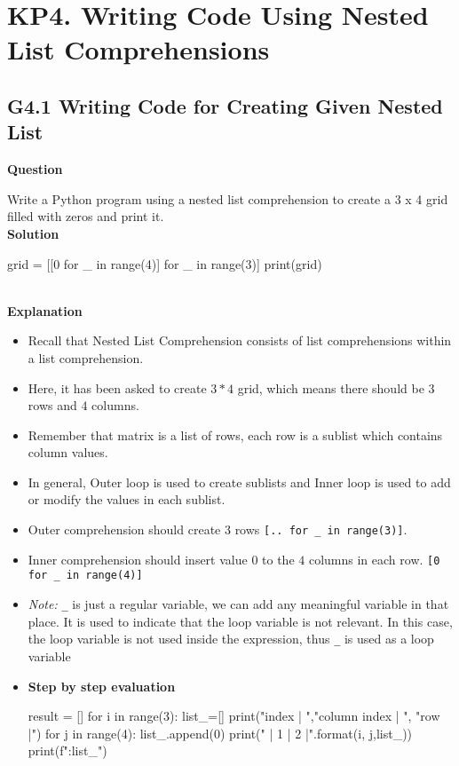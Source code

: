 \documentclass[10pt]{extarticle}
\begin{document}
\section*{KP4. Writing Code Using Nested List Comprehensions}
\subsection*{G4.1 Writing Code for Creating Given Nested List}

\textbf{Question}

Write a Python program using a nested list comprehension to create a 3 x 4 grid filled with zeros and print it. \\

\noindent\textbf{Solution}

\begin{python}
grid = [[0 for _ in range(4)] for _ in range(3)]
print(grid)
\end{python}  \\

\noindent\textbf{Explanation}

\begin{itemize}
    \item Recall that Nested List Comprehension consists of list comprehensions within a list comprehension.
    \item Here, it has been asked to create $ 3*4$ grid, which means there should be $3$ rows and $4$ columns. 
    \item Remember that matrix is a list of rows, each row is a sublist which contains column values.
    \item In general, Outer loop is used to create sublists and Inner loop is used to add or modify the values in each sublist. 
    \item Outer comprehension should create $3$ rows  \colorbox{gray!20}{\texttt{[.. for \_ in range(3)]}}.
    \item Inner comprehension should insert value $0$ to the $4$ columns in each row.  \colorbox{gray!20}{\texttt{[0 for \_ in range(4)]}} 
    \item \textit{Note:} \texttt{\_} is just a regular variable, we can add any meaningful variable in that place. It is used to indicate that the loop variable is not relevant. In this case, the loop variable is not used inside the expression, thus \texttt{\_} is used as a loop variable
    \item \textbf{Step by step evaluation}
    \begin{tcolorbox}[colback=gray!20, colframe=gray!50, sharp corners=southwest]
    \begin{pycode}
result = []
for i in range(3):
  list_=[]
  print("\nrow index | ","column index | ", "row |")
  for j in range(4):
      list_.append(0)
      print("  |  {1}  |  {2}  |".format(i, j,list_))
  print(f"\nRow:{list_}")   

    \end{pycode}
    \end{tcolorbox}
\end{itemize}
\end{document}
